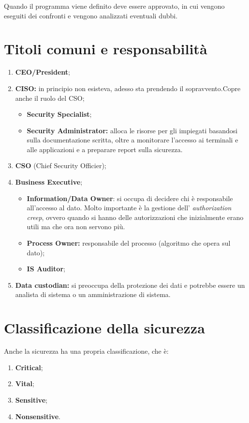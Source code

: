 Quando il programma viene definito deve essere approvato, in cui vengono
eseguiti dei confronti e vengono analizzati eventuali dubbi.

\section{Titoli comuni e responsabilità}

\begin{enumerate}
  \item \textbf{CEO/President};
  \item \textbf{CISO:} in principio non esisteva, adesso sta prendendo il 
  sopravvento.Copre anche il ruolo del CSO;
  \begin{itemize}
        \item \textbf{Security Specialist};
        \item \textbf{Security Administrator:} alloca le risorse per gli 
        impiegati basandosi sulla documentazione scritta, oltre a monitorare 
        l'accesso ai terminali e alle applicazioni e a preparare report sulla 
        sicurezza.
  \end{itemize}
  \item \textbf{CSO} (Chief Security Officier);
  \item \textbf{Business Executive};
  \begin{itemize}
  \item \textbf{Information/Data Owner}: si occupa di decidere chi è 
  responsabile all'accesso al dato. Molto importante è la gestione dell'
  \textit{authorization creep}, ovvero quando si hanno delle autorizzazioni 
  che inizialmente erano utili ma che ora non servono più.
  \item \textbf{Process Owner:} responsabile del processo (algoritmo che opera 
  sul dato);
  \item \textbf{IS Auditor};
  \end{itemize}
  \item \textbf{Data custodian:} si preoccupa della protezione dei dati e 
  potrebbe essere un analista di sistema o un amministrazione di sistema.
\end{enumerate}

\section{Classificazione della sicurezza}

Anche la sicurezza ha una propria classificazione, che è:
\begin{enumerate}
  \item \textbf{Critical};
  \item \textbf{Vital};
  \item \textbf{Sensitive};
  \item \textbf{Nonsensitive}.
\end{enumerate}

